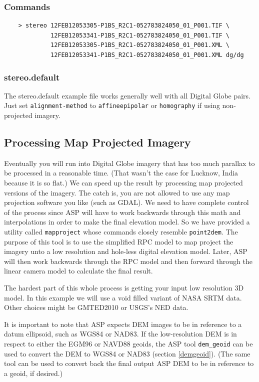 \subsubsection*{Commands}

\begin{verbatim}
    > stereo 12FEB12053305-P1BS_R2C1-052783824050_01_P001.TIF \
             12FEB12053341-P1BS_R2C1-052783824050_01_P001.TIF \
             12FEB12053305-P1BS_R2C1-052783824050_01_P001.XML \
             12FEB12053341-P1BS_R2C1-052783824050_01_P001.XML dg/dg
\end{verbatim}

\subsubsection*{stereo.default}

The stereo.default example file works generally well with all Digital
Globe pairs. Just set \texttt{alignment-method} to
\texttt{affineepipolar} or \texttt{homography} if using non-projected
imagery.

\subsection{Processing Map Projected Imagery}
\label{mapproj}

Eventually you will run into Digital Globe imagery that has too much
parallax to be processed in a reasonable time. (That wasn't the case
for Lucknow, India because it is so flat.) We can speed up the result
by processing map projected versions of the imagery. The catch is, you
are not allowed to use any map projection software you like (such as
GDAL). We need to have complete control of the process since ASP will
have to work backwards through this math and interpolations in order
to make the final elevation model. So we have provided a utility
called \texttt{mapproject} whose commands closely resemble
\texttt{point2dem}. The purpose of this tool is to use the simplified
RPC model to map project the imagery unto a low resolution and
hole-less digital elevation model. Later, ASP will then work backwards
through the RPC model and then forward through the linear camera model
to calculate the final result.

The hardest part of this whole process is getting your input low
resolution 3D model. In this example we will use a void filled variant
of NASA SRTM data. Other choices might be GMTED2010 or USGS's NED
data.

It is important to note that ASP expects DEM images to be in
reference to a datum ellipsoid, such as WGS84 or NAD83. If the
low-resolution DEM is in respect to either the EGM96 or NAVD88 geoids,
the ASP tool \texttt{dem\_geoid} can be used to convert the DEM to WGS84
or NAD83 (section \ref{demgeoid}). (The same tool can be used to convert
back the final output ASP DEM to be in reference to a geoid, if
desired.)

